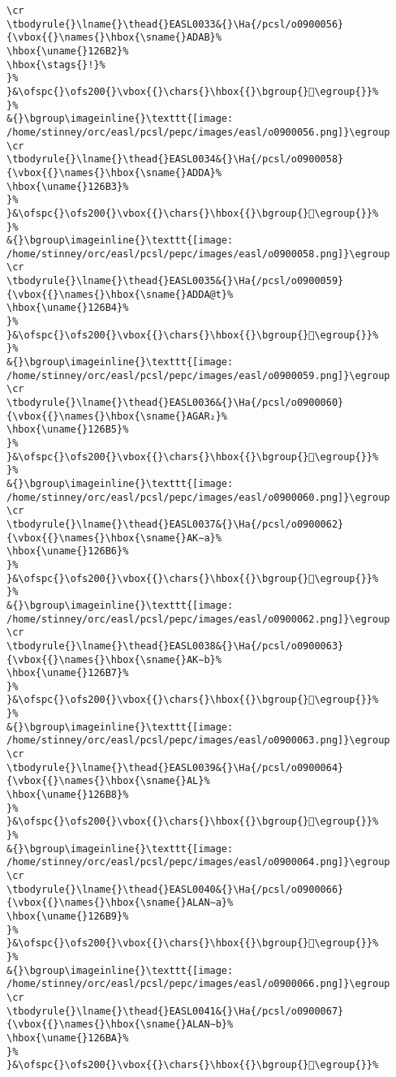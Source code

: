 \begin{verbatim}
\cr
\tbodyrule{}\lname{}\thead{}EASL0033&{}\Ha{/pcsl/o0900056}{\vbox{{}\names{}\hbox{\sname{}ADAB}%
\hbox{\uname{}126B2}%
\hbox{\stags{}!}%
}%
}&\ofspc{}\ofs200{}\vbox{{}\chars{}\hbox{{}\bgroup{}𒚲\egroup{}}%
}%
&{}\bgroup\imageinline{}\texttt{[image: /home/stinney/orc/easl/pcsl/pepc/images/easl/o0900056.png]}\egroup
\cr
\tbodyrule{}\lname{}\thead{}EASL0034&{}\Ha{/pcsl/o0900058}{\vbox{{}\names{}\hbox{\sname{}ADDA}%
\hbox{\uname{}126B3}%
}%
}&\ofspc{}\ofs200{}\vbox{{}\chars{}\hbox{{}\bgroup{}𒚳\egroup{}}%
}%
&{}\bgroup\imageinline{}\texttt{[image: /home/stinney/orc/easl/pcsl/pepc/images/easl/o0900058.png]}\egroup
\cr
\tbodyrule{}\lname{}\thead{}EASL0035&{}\Ha{/pcsl/o0900059}{\vbox{{}\names{}\hbox{\sname{}ADDA@t}%
\hbox{\uname{}126B4}%
}%
}&\ofspc{}\ofs200{}\vbox{{}\chars{}\hbox{{}\bgroup{}𒚴\egroup{}}%
}%
&{}\bgroup\imageinline{}\texttt{[image: /home/stinney/orc/easl/pcsl/pepc/images/easl/o0900059.png]}\egroup
\cr
\tbodyrule{}\lname{}\thead{}EASL0036&{}\Ha{/pcsl/o0900060}{\vbox{{}\names{}\hbox{\sname{}AGAR₂}%
\hbox{\uname{}126B5}%
}%
}&\ofspc{}\ofs200{}\vbox{{}\chars{}\hbox{{}\bgroup{}𒚵\egroup{}}%
}%
&{}\bgroup\imageinline{}\texttt{[image: /home/stinney/orc/easl/pcsl/pepc/images/easl/o0900060.png]}\egroup
\cr
\tbodyrule{}\lname{}\thead{}EASL0037&{}\Ha{/pcsl/o0900062}{\vbox{{}\names{}\hbox{\sname{}AK∼a}%
\hbox{\uname{}126B6}%
}%
}&\ofspc{}\ofs200{}\vbox{{}\chars{}\hbox{{}\bgroup{}𒚶\egroup{}}%
}%
&{}\bgroup\imageinline{}\texttt{[image: /home/stinney/orc/easl/pcsl/pepc/images/easl/o0900062.png]}\egroup
\cr
\tbodyrule{}\lname{}\thead{}EASL0038&{}\Ha{/pcsl/o0900063}{\vbox{{}\names{}\hbox{\sname{}AK∼b}%
\hbox{\uname{}126B7}%
}%
}&\ofspc{}\ofs200{}\vbox{{}\chars{}\hbox{{}\bgroup{}𒚷\egroup{}}%
}%
&{}\bgroup\imageinline{}\texttt{[image: /home/stinney/orc/easl/pcsl/pepc/images/easl/o0900063.png]}\egroup
\cr
\tbodyrule{}\lname{}\thead{}EASL0039&{}\Ha{/pcsl/o0900064}{\vbox{{}\names{}\hbox{\sname{}AL}%
\hbox{\uname{}126B8}%
}%
}&\ofspc{}\ofs200{}\vbox{{}\chars{}\hbox{{}\bgroup{}𒚸\egroup{}}%
}%
&{}\bgroup\imageinline{}\texttt{[image: /home/stinney/orc/easl/pcsl/pepc/images/easl/o0900064.png]}\egroup
\cr
\tbodyrule{}\lname{}\thead{}EASL0040&{}\Ha{/pcsl/o0900066}{\vbox{{}\names{}\hbox{\sname{}ALAN∼a}%
\hbox{\uname{}126B9}%
}%
}&\ofspc{}\ofs200{}\vbox{{}\chars{}\hbox{{}\bgroup{}𒚹\egroup{}}%
}%
&{}\bgroup\imageinline{}\texttt{[image: /home/stinney/orc/easl/pcsl/pepc/images/easl/o0900066.png]}\egroup
\cr
\tbodyrule{}\lname{}\thead{}EASL0041&{}\Ha{/pcsl/o0900067}{\vbox{{}\names{}\hbox{\sname{}ALAN∼b}%
\hbox{\uname{}126BA}%
}%
}&\ofspc{}\ofs200{}\vbox{{}\chars{}\hbox{{}\bgroup{}𒚺\egroup{}}%

\end{verbatim}
